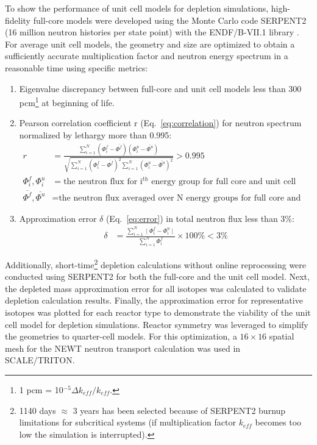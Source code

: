 \documentclass[letterpaper]{mandc2019}
\begin{document}
To show the performance of unit cell models for depletion simulations, high-fidelity full-core models were developed using the Monte Carlo code SERPENT2 (16 million neutron histories per state point) with the ENDF/B-VII.1 library \cite{leppanen_serpent_2015, chadwick_endf/b-vii.1_2011}. 
For average unit cell models, the geometry and size are optimized to obtain a sufficiently accurate multiplication factor and neutron energy spectrum in a reasonable time using specific metrics:
\begin{enumerate}
	\item Eigenvalue discrepancy between full-core and unit cell models less than 300 pcm\footnote{ 1 pcm = 10$^{-5}\Delta k_{eff}/k_{eff}$.} at beginning of life.\vspace{-0.1in}
	\item Pearson correlation coefficient r (Eq.~\ref{eq:correlation}) for neutron spectrum normalized by lethargy more than 0.995:
\begin{align}
r &= \frac{\sum_{i=1}^{N} (\Phi_i^f-\overline{\Phi^f})(\Phi_i^u-\overline{\Phi^u})}
		  {\sqrt{\sum_{i=1}^{N} (\Phi_i^f-\overline{\Phi^f})^2 \sum_{i=1}^{N} (\Phi_i^u-\overline{\Phi^u})^2}} > 0.995 \label{eq:correlation} \\
\Phi_i^f,\Phi_i^u &= \mbox{the neutron flux for i$^{th}$ energy group for full core and unit cell} \nonumber\\
\overline{\Phi^f}, \overline{\Phi^u} &= \mbox{the neutron flux averaged over N energy groups for full core and unit cell} \nonumber
\end{align}		\vspace{-0.3in}
	\item Approximation error $\delta$ (Eq.~\ref{eq:error})  in total neutron flux less than 3\%:
\begin{align}
\delta &= \frac{\sum_{i=1}^{N} \mid \Phi_i^f-\Phi_i^u \mid }
{\sum_{i=1}^{N} \Phi_i^f} \times 100\% < 3\% \label{eq:error}
\end{align}	
	\vspace{-0.4in}
\end{enumerate}

Additionally, short-time\footnote{1140 days $\approx$ 3 years has been selected because of SERPENT2 burnup limitations for subcritical systems (if multiplication factor $k_{eff}$ becomes too low the simulation is interrupted).} depletion calculations without online reprocessing were conducted using SERPENT2 for both the full-core and the unit cell model. 
Next, the depleted mass approximation error for all isotopes was calculated to validate depletion calculation results. 
Finally, the approximation error for representative isotopes was plotted for each reactor type to demonstrate the viability of the unit cell model for depletion simulations. 
Reactor symmetry was leveraged to simplify the geometries to quarter-cell models. 
For this optimization, a $16\times 16$ spatial mesh for the NEWT neutron transport calculation was used in SCALE/TRITON.
\end{document}
